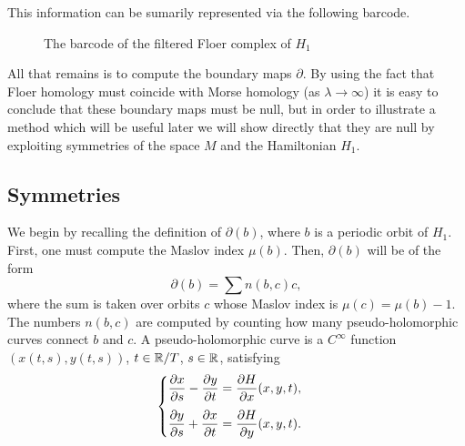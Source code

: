 \begin{prop}
This information can be sumarily represented via the following barcode.
\begin{figure}[H]
\centering
{}
\caption{The barcode of the filtered Floer complex of $H_1$}
\end{figure}
\end{prop}

All that remains is to compute the boundary maps $\partial$. By using the fact that Floer homology must coincide with Morse homology (as $\lambda \to \infty$) it is easy to conclude that these boundary maps must be null, but in order to illustrate a method which will be useful later we will show directly that they are null by exploiting symmetries of the space $M$ and the Hamiltonian $H_1$.

\subsection{Symmetries}\label{sec:symmetries}

We begin by recalling the definition of $\partial(b)$, where $b$ is a periodic orbit of $H_1$. First, one must compute the Maslov index $\mu(b)$. Then, $\partial(b)$ will be of the form
\begin{equation}
\partial(b) = \sum n(b,c) c,
\end{equation}
where the sum is taken over orbits $c$ whose Maslov index is $\mu(c) = \mu(b)-1$. The numbers $n(b,c)$ are computed by counting how many pseudo-holomorphic curves connect $b$ and $c$. A pseudo-holomorphic curve is a $C^\infty$ function $(x(t,s), y(t,s))$, $t \in \mathbb{R} / T$, $s \in \mathbb{R}$, satisfying
\begin{equation}\label{pseudoholomorphic}
\begin{cases}
\displaystyle \diffp x s - \diffp y t = \diffp H x(x,y,t),\\[1em]
\displaystyle \diffp y s + \diffp x t = \diffp H y(x,y,t).
\end{cases}
\end{equation}

